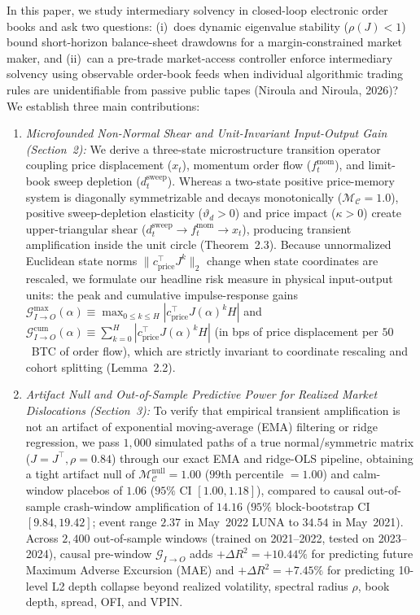 \documentclass[11pt]{article}
\theoremstyle{remark}
\begin{document}
In this paper, we study intermediary solvency in closed-loop electronic order books and ask two questions: (i)~does dynamic eigenvalue stability ($\rho(J)<1$) bound short-horizon balance-sheet drawdowns for a margin-constrained market maker, and (ii)~can a pre-trade market-access controller enforce intermediary solvency using observable order-book feeds when individual algorithmic trading rules are unidentifiable from passive public tapes (Niroula and Niroula, 2026)? We establish three main contributions:
\begin{enumerate}
    \item \emph{Microfounded Non-Normal Shear and Unit-Invariant Input-Output Gain (Section~2):} We derive a three-state microstructure transition operator coupling price displacement ($x_t$), momentum order flow ($f_t^{\text{mom}}$), and limit-book sweep depletion ($d_t^{\text{sweep}}$). Whereas a two-state positive price-memory system is diagonally symmetrizable and decays monotonically ($\mathcal{M}_{\mathcal{C}}=1.0$), positive sweep-depletion elasticity ($\vartheta_d > 0$) and price impact ($\kappa > 0$) create upper-triangular shear ($d_t^{\text{sweep}} \to f_t^{\text{mom}} \to x_t$), producing transient amplification inside the unit circle (Theorem~2.3). Because unnormalized Euclidean state norms $\|c_{\text{price}}^\top J^k\|_2$ change when state coordinates are rescaled, we formulate our headline risk measure in physical input-output units: the peak and cumulative impulse-response gains $\mathcal{G}_{I\to O}^{\max}(\alpha) \equiv \max_{0 \le k \le H}|c_{\text{price}}^\top J(\alpha)^k H|$ and $\mathcal{G}_{I\to O}^{\text{cum}}(\alpha) \equiv \sum_{k=0}^H |c_{\text{price}}^\top J(\alpha)^k H|$ (in bps of price displacement per $50$~BTC of order flow), which are strictly invariant to coordinate rescaling and cohort splitting (Lemma~2.2).
    \item \emph{Artifact Null and Out-of-Sample Predictive Power for Realized Market Dislocations (Section~3):} To verify that empirical transient amplification is not an artifact of exponential moving-average (EMA) filtering or ridge regression, we pass $1{,}000$ simulated paths of a true normal/symmetric matrix ($J = J^\top, \rho = 0.84$) through our exact EMA and ridge-OLS pipeline, obtaining a tight artifact null of $\mathcal{M}_{\mathcal{C}}^{\text{null}} = 1.00$ ($99$th percentile $= 1.00$) and calm-window placebos of $1.06$ ($95\%$ CI $[1.00, 1.18]$), compared to causal out-of-sample crash-window amplification of $14.16$ ($95\%$ block-bootstrap CI $[9.84, 19.42]$; event range $2.37$ in May~2022 LUNA to $34.54$ in May~2021). Across $2{,}400$ out-of-sample windows (trained on 2021--2022, tested on 2023--2024), causal pre-window $\mathcal{G}_{I\to O}$ adds $+\Delta R^2 = +10.44\%$ for predicting future Maximum Adverse Excursion (MAE) and $+\Delta R^2 = +7.45\%$ for predicting 10-level L2 depth collapse beyond realized volatility, spectral radius $\rho$, book depth, spread, OFI, and VPIN.

\end{enumerate}
\end{document}
